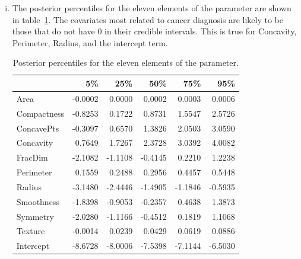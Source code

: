 \begin{enumerate}
\begin{enumerate}[i)]
    \FloatBlock
    \item
    The posterior percentiles for the eleven elements of the parameter are
    shown in table~\ref{tab:pct}. The covariates most related to cancer
    diagnosis are likely to be those that do not have $0$ in their
    credible intervals. This is true for Concavity, Perimeter, Radius,
    and the intercept term.
        \begin{table}[hbt]
        \begin{tabular}{lrrrrr}
        \toprule
        & 5\% & 25\% & 50\% & 75\% & 95\% \\
        \midrule
        Area        & -0.0002 &  0.0000 & 0.0002  & 0.0003  & 0.0006 \\
        Compactness & -0.8253 &  0.1722 & 0.8731  & 1.5547  & 2.5726 \\
        ConcavePts  & -0.3097 &  0.6570 & 1.3826  & 2.0503  & 3.0590 \\
        Concavity   &  0.7649 &  1.7267 & 2.3728  & 3.0392  & 4.0082 \\
        FracDim     & -2.1082 & -1.1108 & -0.4145 & 0.2210  & 1.2238 \\
        Perimeter   &  0.1559 &  0.2488 & 0.2956  & 0.4457  & 0.5448 \\
        Radius      & -3.1480 & -2.4446 & -1.4905 & -1.1846 & -0.5935 \\
        Smoothness  & -1.8398 & -0.9053 & -0.2357 & 0.4638  & 1.3873 \\
        Symmetry    & -2.0280 & -1.1166 & -0.4512 & 0.1819  & 1.1068 \\
        Texture     & -0.0014 & 0.0239  & 0.0429  & 0.0619  & 0.0886 \\
        Intercept   & -8.6728 & -8.0006 & -7.5398 & -7.1144 & -6.5030 \\
        \bottomrule
        \end{tabular}
        \caption{
            Posterior percentiles for the eleven elements of the parameter.
        }
        \label{tab:pct}
        \end{table}


\end{enumerate}
\end{enumerate}
